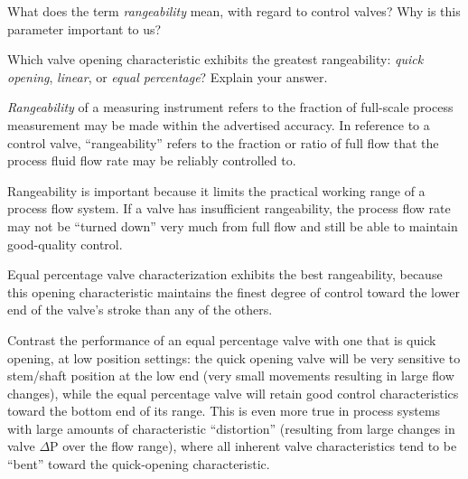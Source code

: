 

What does the term {\it rangeability} mean, with regard to control valves?  Why is this parameter important to us?  

\vskip 10pt

Which valve opening characteristic exhibits the greatest rangeability: {\it quick opening}, {\it linear}, or {\it equal percentage}?  Explain your answer.







{\it Rangeability} of a measuring instrument refers to the fraction of full-scale process measurement may be made within the advertised accuracy.  In reference to a control valve, ``rangeability'' refers to the fraction or ratio of full flow that the process fluid flow rate may be reliably controlled to.
 
Rangeability is important because it limits the practical working range of a process flow system.  If a valve has insufficient rangeability, the process flow rate may not be ``turned down'' very much from full flow and still be able to maintain good-quality control.

\vskip 10pt

Equal percentage valve characterization exhibits the best rangeability, because this opening characteristic maintains the finest degree of control toward the lower end of the valve's stroke than any of the others.

Contrast the performance of an equal percentage valve with one that is quick opening, at low position settings: the quick opening valve will be very sensitive to stem/shaft position at the low end (very small movements resulting in large flow changes), while the equal percentage valve will retain good control characteristics toward the bottom end of its range.  This is even more true in process systems with large amounts of characteristic ``distortion'' (resulting from large changes in valve $\Delta$P over the flow range), where all inherent valve characteristics tend to be ``bent'' toward the quick-opening characteristic.
 











